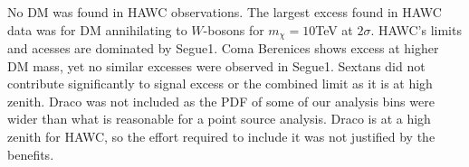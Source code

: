 No DM was found in HAWC observations.
The largest excess found in HAWC data was for DM annihilating to $W$-bosons for $m_\chi = 10$TeV at $2\sigma$.
HAWC's limits and acesses are dominated by Segue1.
Coma Berenices shows excess at higher DM mass, yet no similar excesses were observed in Segue1.
Sextans did not contribute significantly to signal excess or the combined limit as it is at high zenith.
Draco was not included as the PDF of some of our analysis bins were wider than what is reasonable for a point source analysis.
Draco is at a high zenith for HAWC, so the effort required to include it was not justified by the benefits.


\begin{figure}[h]
\end{figure}
